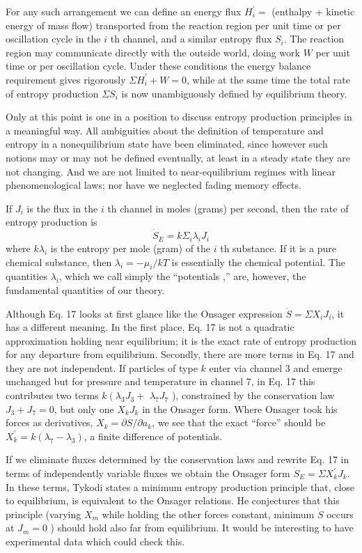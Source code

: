 \documentclass{article}
\begin{document}
For any such arrangement we can define an energy flux $H_i^{\prime}=$ (enthalpy + kinetic energy of mass flow) transported from the reaction region per unit time or per oscillation cycle in the $i$ th channel, and a similar entropy flux $S_i$. The reaction region may communicate directly with the outside world, doing work $W$ per unit time or per oscillation cycle. Under these conditions the energy balance requirement gives rigorously $\Sigma H_i^{\prime}+W=0$, while at the same time the total rate of entropy production $\Sigma S_i$ is now unambiguously defined by equilibrium theory.

Only at this point is one in a position to discuss entropy production principles in a meaningful way. All ambiguities about the definition of temperature and entropy in a nonequilibrium state have been eliminated, since however such notions may or may not be defined eventually, at least in a steady state they are not changing. And we are not limited to near-equilibrium regimes with linear phenomenological laws; nor have we neglected fading memory effects.

If $J_i$ is the flux in the $i$ th channel in moles (grams) per second, then the rate of entropy production is
$$
\dot{S}_E=k \Sigma_i \lambda_i J_i
$$
where $k \lambda_i$ is the entropy per mole (gram) of the $i$ th substance. If it is a pure chemical substance, then $\lambda_i=-\mu_i / k T$ is essentially the chemical potential. The quantities $\lambda_i$, which we call simply the ``potentials ,'' are, however, the fundamental quantities of our theory.

Although Eq. 17 looks at first glance like the Onsager expression $\dot{S}=\Sigma X_i J_i$, it has a different meaning. In the first place, Eq. 17 is not a quadratic approximation holding near equilibrium; it is the exact rate of entropy production for any departure from equilibrium. Secondly, there are more terms in Eq. 17 and they are not independent. If particles of type $k$ enter via channel 3 and emerge unchanged but for pressure and temperature in channel 7, in Eq. 17 this contributes two terms $k\left(\lambda_3 J_3+\right.$ $\lambda_7 J_7$ ), constrained by the conservation law $J_3+J_7=0$, but only one $X_k J_k$ in the Onsager form. Where Onsager took his forces as derivatives, $X_k=\partial S / \partial a_k$, we see that the exact ``force'' should be $X_k^{\prime}=k\left(\lambda_7-\lambda_3\right)$, a finite difference of potentials.

If we eliminate fluxes determined by the conservation laws and rewrite Eq. 17 in terms of independently variable fluxes we obtain the Onsager form $\dot{S}_E=\Sigma X_k^{\prime} J_k$. In these terms, Tykodi states a minimum entropy production principle that, close to equilibrium, is equivalent to the Onsager relations. He conjectures that this principle (varying $X_m$ while holding the other forces constant, minimum $\dot{S}$ occurs at $J_m=0$ ) should hold also far from equilibrium. It would be interesting to have experimental data which could check this.
\end{document}
